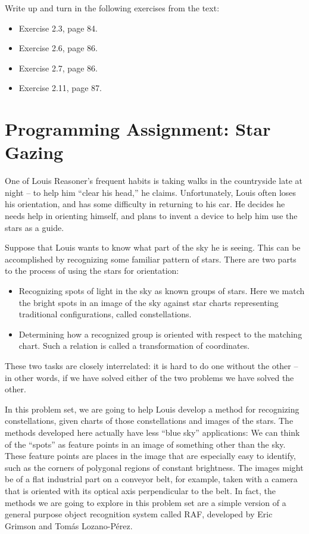 Write up and turn in the following exercises from the text:

\begin{itemize}
\item Exercise 2.3, page 84.
\item Exercise 2.6, page 86.
\item Exercise 2.7, page 86.
\item Exercise 2.11, page 87.
\end{itemize}

\section{Programming Assignment: Star Gazing}

One of Louis Reasoner's frequent habits is taking walks in the countryside late
at night -- to help him ``clear his head,'' he claims.  Unfortunately, Louis
often loses his orientation, and has some difficulty in returning to his car.
He decides he needs help in orienting himself, and plans to invent a device to
help him use the stars as a guide.

Suppose that Louis wants to know what part of the sky he is seeing.
This can be accomplished by recognizing some familiar pattern of
stars.  There are two parts to the process of using the stars for
orientation:

\begin{itemize}

\item Recognizing spots of light in the sky as known groups of stars.  
Here we match the bright spots in an image of the sky against star
charts representing traditional configurations, called constellations.

\item Determining how a recognized group is oriented with respect to
the matching chart.  Such a relation is called a transformation of
coordinates.

\end{itemize}

These two tasks are closely interrelated: it is hard to do one without
the other -- in other words, if we have solved either of the two
problems we have solved the other.

In this problem set, we are going to help Louis develop a method for
recognizing constellations, given charts of those constellations and images of
the stars.  The methods developed here actually have less ``blue sky''
applications: We can think of the ``spots'' as feature points in an image of
something other than the sky.  These feature points are places in the image
that are especially easy to identify, such as the corners of polygonal regions
of constant brightness.  The images might be of a flat industrial part on a
conveyor belt, for example, taken with a camera that is oriented with its
optical axis perpendicular to the belt.  In fact, the methods we are going to
explore in this problem set are a simple version of a general purpose object
recognition system called RAF, developed by Eric Grimson and Tom\'as
Lozano-P\'erez.

